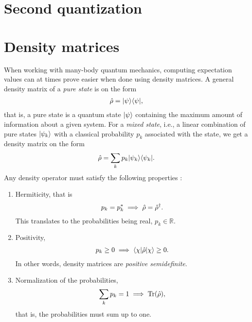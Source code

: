     \section{Second quantization}

    \section{Density matrices}
        When working with many-body quantum mechanics, computing expectation
        values can at times prove easier when done using density matrices. A
        general density matrix of a \emph{pure state} is on the form
        \begin{align}
            \hat{\rho} = | \psi \rangle\langle \psi |,
        \end{align}
        that is, a pure state is a quantum state $| \psi \rangle$ containing the
        maximum amount of information about a given system. For a \emph{mixed
        state}, i.e., a linear combination of pure states $| \psi_k \rangle$ with a
        classical probability $p_k$ associated with the state, we get a density
        matrix on the form
        \begin{align}
            \hat{\rho} = \sum_{k} p_k | \psi_k \rangle\langle \psi_k |.
        \end{align}
        Any density operator must satisfy the following
        properties \cite{modern-qm}:
        \begin{enumerate}
            \item Hermiticity, that is
                \begin{align}
                    p_k = p_k^{*} \implies \hat{\rho} = \hat{\rho}^{\dagger}.
                \end{align}
                This translates to the probabilities being real, $p_k \in
                \mathbb{R}$.
            \item Positivity,
                \begin{align}
                    p_k \geq 0 \implies \langle \chi |\hat{\rho}| \chi \rangle \geq 0.
                \end{align}
                In other words, density matrices are \emph{positive
                semidefinite}.
            \item Normalization of the probabilities,
                \begin{align}
                    \sum_{k} p_k = 1 \implies \operatorname{Tr}(\hat{\rho}),
                \end{align}
                that is, the probabilities must sum up to one.
        \end{enumerate}
